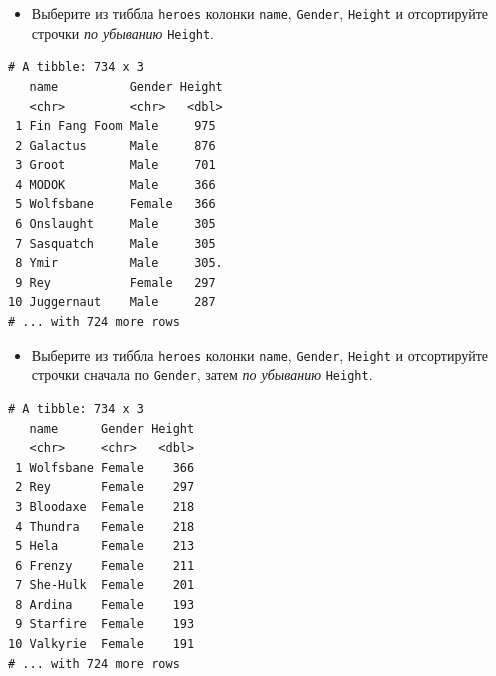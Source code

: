 \documentclass[
]{book}
\newenvironment{Shaded}{\begin{snugshade}}{\end{snugshade}}
\newcommand{\KeywordTok}[1]{\textcolor[rgb]{0.13,0.29,0.53}{\textbf{#1}}}
\newcommand{\NormalTok}[1]{#1}
\newcommand{\OperatorTok}[1]{\textcolor[rgb]{0.81,0.36,0.00}{\textbf{#1}}}
\newcommand{\StringTok}[1]{\textcolor[rgb]{0.31,0.60,0.02}{#1}}
\providecommand{\tightlist}{%
  \setlength{\itemsep}{0pt}\setlength{\parskip}{0pt}}
\begin{document}
\begin{itemize}
\tightlist
\item
  Выберите из тиббла \texttt{heroes} колонки \texttt{name}, \texttt{Gender}, \texttt{Height} и отсортируйте строчки \emph{по убыванию} \texttt{Height}.
\end{itemize}

\begin{Shaded}
\end{Shaded}

\begin{verbatim}
# A tibble: 734 x 3
   name          Gender Height
   <chr>         <chr>   <dbl>
 1 Fin Fang Foom Male     975 
 2 Galactus      Male     876 
 3 Groot         Male     701 
 4 MODOK         Male     366 
 5 Wolfsbane     Female   366 
 6 Onslaught     Male     305 
 7 Sasquatch     Male     305 
 8 Ymir          Male     305.
 9 Rey           Female   297 
10 Juggernaut    Male     287 
# ... with 724 more rows
\end{verbatim}

\begin{itemize}
\tightlist
\item
  Выберите из тиббла \texttt{heroes} колонки \texttt{name}, \texttt{Gender}, \texttt{Height} и отсортируйте строчки сначала по \texttt{Gender}, затем \emph{по убыванию} \texttt{Height}.
\end{itemize}

\begin{Shaded}
\end{Shaded}

\begin{verbatim}
# A tibble: 734 x 3
   name      Gender Height
   <chr>     <chr>   <dbl>
 1 Wolfsbane Female    366
 2 Rey       Female    297
 3 Bloodaxe  Female    218
 4 Thundra   Female    218
 5 Hela      Female    213
 6 Frenzy    Female    211
 7 She-Hulk  Female    201
 8 Ardina    Female    193
 9 Starfire  Female    193
10 Valkyrie  Female    191
# ... with 724 more rows
\end{verbatim}
\end{document}

